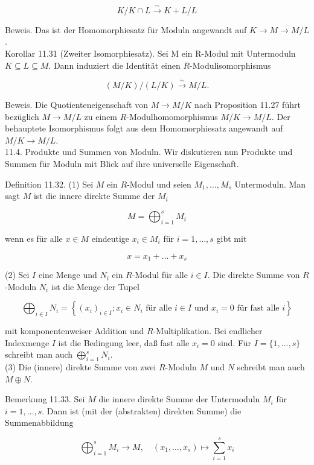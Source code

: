 \documentclass[10pt, letterpaper]{article}
\begin{document}
$$
K / K \cap L \xrightarrow{\sim} K+L / L
$$

Beweis. Das ist der Homomorphiesatz für Moduln angewandt auf $K \rightarrow M \rightarrow M / L$.\\
Korollar 11.31 (Zweiter Isomorphiesatz). Sei M ein R-Modul mit Untermoduln $K \subseteq L \subseteq M$. Dann induziert die Identität einen $R$-Modulisomorphismus

$$
(M / K) /(L / K) \xrightarrow{\sim} M / L .
$$

Beweis. Die Quotienteneigenschaft von $M \rightarrow M / K$ nach Proposition 11.27 führt bezüglich $M \rightarrow M / L$ zu einem $R$-Modulhomomorphismus $M / K \rightarrow M / L$. Der behauptete Isomorphismus folgt aus dem Homomorphiesatz angewandt auf $M / K \rightarrow M / L$.\\
11.4. Produkte und Summen von Moduln. Wir diskutieren nun Produkte und Summen für Moduln mit Blick auf ihre universelle Eigenschaft.

Definition 11.32. (1) Sei $M$ ein $R$-Modul und seien $M_{1}, \ldots, M_{s}$ Untermoduln. Man sagt $M$ ist die innere direkte Summe der $M_{i}$

$$
M=\bigoplus_{i=1}^{s} M_{i}
$$

wenn es für alle $x \in M$ eindeutige $x_{i} \in M_{i}$ für $i=1, \ldots, s$ gibt mit

$$
x=x_{1}+\ldots+x_{s}
$$

(2) Sei $I$ eine Menge und $N_{i}$ ein $R$-Modul für alle $i \in I$. Die direkte Summe von $R$-Moduln $N_{i}$ ist die Menge der Tupel

$$
\bigoplus_{i \in I} N_{i}=\left\{\left(x_{i}\right)_{i \in I} ; x_{i} \in N_{i} \text { für alle } i \in I \text { und } x_{i}=0 \text { für fast alle } i\right\}
$$

mit komponentenweiser Addition und $R$-Multiplikation. Bei endlicher Indexmenge $I$ ist die Bedingung leer, daß fast alle $x_{i}=0$ sind. Für $I=\{1, \ldots, s\}$ schreibt man auch $\bigoplus_{i=1}^{s} N_{i}$.\\
(3) Die (innere) direkte Summe von zwei $R$-Moduln $M$ und $N$ schreibt man auch $M \oplus N$.

Bemerkung 11.33. Sei $M$ die innere direkte Summe der Untermoduln $M_{i}$ für $i=1, \ldots, s$. Dann ist (mit der (abstrakten) direkten Summe) die Summenabbildung

$$
\bigoplus_{i=1}^{s} M_{i} \rightarrow M, \quad\left(x_{1}, \ldots, x_{s}\right) \mapsto \sum_{i=1}^{s} x_{i}
$$
\end{document}
